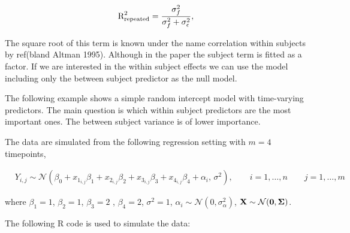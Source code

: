 \documentclass[11pt,a4paper,twoside]{book}\usepackage[]{graphicx}\usepackage[]{color}
\begin{document}
   \begin{align} 
\text{R}^2_{\text{repeated}} = \frac{\sigma_{f}^2}{\sigma_{f}^2  + \sigma_{\epsilon}^2},
\end{align}

The square root of this term is known under the name correlation within subjects by ref(bland Altman 1995). Although in the paper the subject term is fitted as a factor. If we are interested in the within subject effects we can use the model including only the between subject predictor as the null model.

The following example shows a simple random intercept model with time-varying predictors. The main question is which within subject predictors are the most important ones. The between subject variance is of lower importance. 

The data are simulated from the following regression setting with $m = 4$ timepoints,

\begin{align} 
&Y_{i,j} \sim \mathcal{N}(\beta_{0}+x_{1_{i,j}} \beta_{1}+x_{2_{i,j}} \beta_{2}+x_{3_{i,j}} \beta_{3}+x_{4_{i,j}} \beta_{4} + \alpha_{i}, \, \sigma^2), \qquad i = 1, \dots, n \qquad j = 1, \dots, m
\end{align} 

where $\beta_{1} = 1$, $\beta_{2} = 1$,  $\beta_{3} = 2$ , $\beta_{4}=2$, $\sigma^2 = 1$, $\alpha_{i} \sim \mathcal{N}(0, \sigma_{\alpha}^2)$, ${\mathbf{X}} \sim \mathcal{N}({\mathbf{0}}, {\boldsymbol{\Sigma}}{})$.

The following R code is used to simulate the data:
\end{document}
